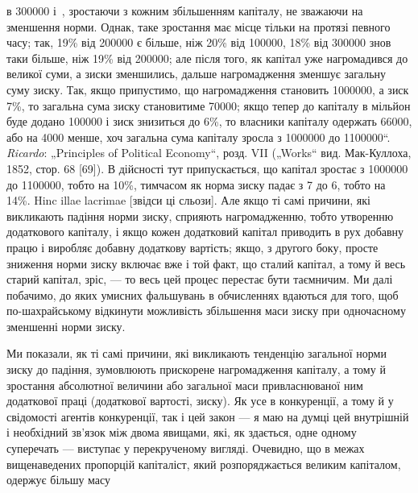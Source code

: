{в \num{300000} і~, зростаючи з кожним збільшенням капіталу,
не зважаючи на зменшення норми. Однак, таке зростання має місце тільки на
протязі певного часу; так, 19\% від \num{200000} є більше, ніж 20\%
від \num{100000}, 18\% від \num{300000} знов таки
більше, ніж 19\% від \num{200000}; але після того, як капітал уже
нагромадився до великої суми, а зиски зменшились, дальше нагромадження
зменшує загальну суму зиску. Так, якщо припустимо, що нагромадження
становить \num{1000000}, а зиск 7\%, то загальна сума зиску становитиме
\num{70000}; якщо тепер до капіталу в мільйон буде
додано \num{100000} і зиск знизиться до 6\%, то власники капіталу
одержать \num{66000}, або на 4000 менше, хоч
загальна сума капіталу зросла з \num{1000000} до \num{1100000}“. \emph{Ricardo}: „Principles of Political Economy“, розд. VII („Works“
вид. Мак-Куллоха, 1852, стор. 68 [69]). В дійсності тут припускається, що капітал
зростає з \num{1000000} до \num{1100000}, тобто на 10\%, тимчасом як норма зиску
падає з 7 до 6, тобто на 14\%. Hinc illae lacrimae [звідси ці сльози].} Але
якщо ті самі причини, які викликають падіння норми зиску,
сприяють нагромадженню, тобто утворенню додаткового капіталу,
і якщо кожен додатковий капітал приводить в рух добавну
працю і виробляє добавну додаткову вартість; якщо, з другого
боку, просте зниження норми зиску включає вже і той
факт, що сталий капітал, а тому й весь старий капітал, зріс, —
то весь цей процес перестає бути таємничим. Ми далі побачимо,
до яких умисних фальшувань в обчисленнях вдаються
для того, щоб по-шахрайському відкинути можливість збільшення
маси зиску при одночасному зменшенні норми зиску.

Ми показали, як ті самі причини, які викликають тенденцію
загальної норми зиску до падіння, зумовлюють прискорене нагромадження
капіталу, а тому й зростання абсолютної величини або
загальної маси привласнюваної ним додаткової праці (додаткової
вартості, зиску). Як усе в конкуренції, а тому й у свідомості
агентів конкуренції, так і цей закон — я маю на думці цей внутрішній
і необхідний зв’язок між двома явищами, які, як здається,
одне одному суперечать — виступає у перекрученому вигляді.
Очевидно, що в межах вищенаведених пропорцій капіталіст,
який розпоряджається великим капіталом, одержує більшу масу
\parbreak{}  %
